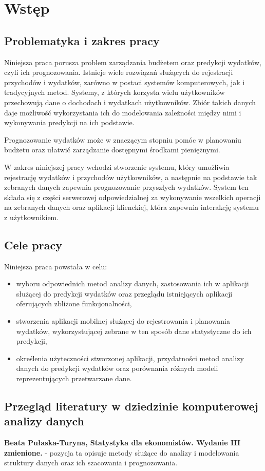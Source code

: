 \chapter{Wstęp}
\section{Problematyka i zakres pracy}
Niniejsza praca porusza problem zarządzania budżetem oraz predykcji wydatków, czyli ich prognozowania. Istnieje wiele rozwiązań służących do rejestracji przychodów i wydatków, zarówno w postaci systemów komputerowych, jak i tradycyjnych metod. Systemy, z których korzysta wielu użytkowników przechowują dane o dochodach i wydatkach użytkowników. Zbiór takich danych daje możliwość wykorzystania ich do modelowania zależności między nimi i wykonywania predykcji na ich podstawie.

Prognozowanie wydatków może w znaczącym stopniu pomóc w planowaniu budżetu oraz ułatwić zarządzanie dostępnymi środkami pieniężnymi.

W zakres niniejszej pracy wchodzi stworzenie systemu, który umożliwia rejestrację wydatków i przychodów użytkowników, a następnie na podstawie tak zebranych danych zapewnia prognozowanie przyszłych wydatków. System ten składa się z części serwerowej odpowiedzialnej za wykonywanie wszelkich operacji na zebranych danych oraz aplikacji klienckiej, która zapewnia interakcję systemu z użytkownikiem.
\section{Cele pracy}
Niniejsza praca powstała w celu:
\begin{itemize}
	\item wyboru odpowiednich metod analizy danych, zastosowania ich w aplikacji służącej do predykcji wydatków oraz przeglądu istniejących aplikacji oferujących zbliżone funkcjonalności,
	\item stworzenia aplikacji mobilnej służącej do rejestrowania i planowania wydatków, wykorzystującej zebrane w ten sposób dane statystyczne do ich predykcji,
	\item określenia użyteczności stworzonej aplikacji, przydatności metod analizy danych do predykcji wydatków oraz porównania różnych modeli reprezentujących przetwarzane dane.
\end{itemize}
\section{Przegląd literatury w dziedzinie komputerowej analizy danych}
\textbf{Beata Pułaska-Turyna, Statystyka dla ekonomistów. Wydanie III zmienione.} - pozycja ta opisuje metody służące do analizy i modelowania struktury danych oraz ich szacowania i prognozowania.

